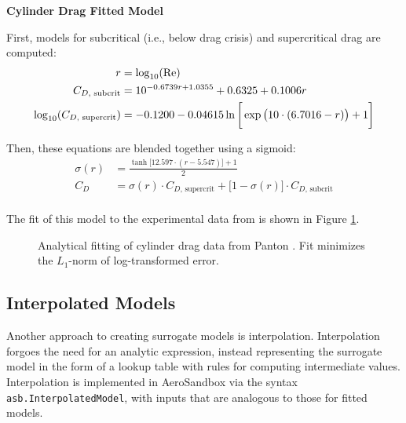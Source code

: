 \begin{example}
    \noindent
    \textbf{Cylinder Drag Fitted Model}

    \noindent
    First, models for subcritical (i.e., below drag crisis) and supercritical drag are computed:
    \begin{equation*}
        \begin{aligned}
            r &= \log_{10}(\text{Re}) \\
            C_{D\text{, subcrit}} &= 10^ {-0.6739 r + 1.0355} + 0.6325 + 0.1006 r \\
            \log_{10}(C_{D\text{, supercrit}}) &= -0.1200 - 0.04615 \ln\bigg[\exp\big(10 \cdot (6.7016 - r)\big) + 1 \bigg] \\
        \end{aligned}
    \end{equation*}

    \noindent
    Then, these equations are blended together using a sigmoid:
    \begin{equation}
        \begin{aligned}
            \sigma(r) &= \frac{\tanh \big[12.597 \cdot (r - 5.547)\big] + 1}{2} \\
            C_D &= \sigma(r) \cdot C_{D\text{, supercrit}} + \big[1 - \sigma(r)\big] \cdot C_{D\text{, subcrit}} \\
        \end{aligned}
    \end{equation}
\end{example}

\noindent
The fit of this model to the experimental data from \cite{Panton} is shown in Figure \ref{fig:cylinder-drag}.

\begin{figure}[H]
    \centering
    \ifdraft{}{\centerline{}}
    \caption{Analytical fitting of cylinder drag data from Panton \cite{Panton}. Fit minimizes the $L_1$-norm of log-transformed error.}
    \label{fig:cylinder-drag}
\end{figure}

\subsection{Interpolated Models}
\label{sect:interpolation}

Another approach to creating surrogate models is interpolation. Interpolation forgoes the need for an analytic expression, instead representing the surrogate model in the form of a lookup table with rules for computing intermediate values. Interpolation is implemented in AeroSandbox via the syntax \texttt{asb.InterpolatedModel}, with inputs that are analogous to those for fitted models.

